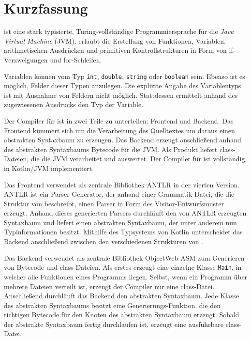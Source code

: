 \chapter{Kurzfassung}

\Toya ist eine stark typisierte, Turing-vollständige Programmiersprache für die \textit{Java Virtual Machine} (JVM). \Toya erlaubt die Erstellung von Funktionen, Variablen, arithmetischen Ausdrücken und primitiven Kontrollstrukturen in Form von if-Verzweigungen und for-Schleifen.

Variablen können vom Typ \texttt{int}, \texttt{double}, \texttt{string} oder \texttt{boolean} sein. Ebenso ist es möglich, Felder dieser Typen anzulegen. Die explizite Angabe des Variablentyps ist mit Ausnahme von Feldern nicht möglich. Stattdessen ermittelt \toya anhand des zugewiesenen Ausdrucks den Typ der Variable.

Der Compiler für \toya ist in zwei Teile zu unterteilen: Frontend und Backend. Das Frontend kümmert sich um die Verarbeitung des Quelltextes um daraus einen abstrakten Syntaxbaum zu erzeugen. Das Backend erzeugt anschließend anhand des abstrakten Syntaxbaums Bytecode für die JVM. Als Produkt liefert \toya class-Dateien, die die JVM verarbeitet und auswertet. Der Compiler für \toya ist vollständig in Kotlin/JVM implementiert.

Das Frontend verwendet als zentrale Bibliothek ANTLR in der vierten Version. ANTLR ist ein Parser-Generator, der anhand einer Grammatik-Datei, die die Struktur von \toya beschreibt, einen Parser in Form des Visitor-Entwurfsmuster erzeugt. Anhand dieses generierten Parsers durchläuft \toya den von ANTLR erzeugten Syntaxbaum und liefert einen abstrakten Syntaxbaum, der unter anderem nun Typinformationen besitzt. Mithilfe des Typsystems von Kotlin unterscheidet das Backend anschließend zwischen den verschiedenen Strukturen von \toya.

Das Backend verwendet als zentrale Bibliothek ObjectWeb ASM zum Generieren von Bytecode und class-Dateien. Als erstes erzeugt \toya eine einzelne Klasse \texttt{Main}, in welcher alle Funktionen eines \toya Programms liegen. Selbst, wenn ein \toya Programm über mehrere Dateien verteilt ist, erzeugt der Compiler nur eine class-Datei. Anschließend durchläuft das Backend den abstrakten Syntaxbaum. Jede Klasse des abstrakten Syntaxbaums besitzt eine Generierungs-Funktion, die den richtigen Bytecode für den Knoten des abstrakten Syntaxbaum erzeugt. Sobald der abstrakte Syntaxbaum fertig durchlaufen ist, erzeugt \toya eine ausführbare class-Datei.